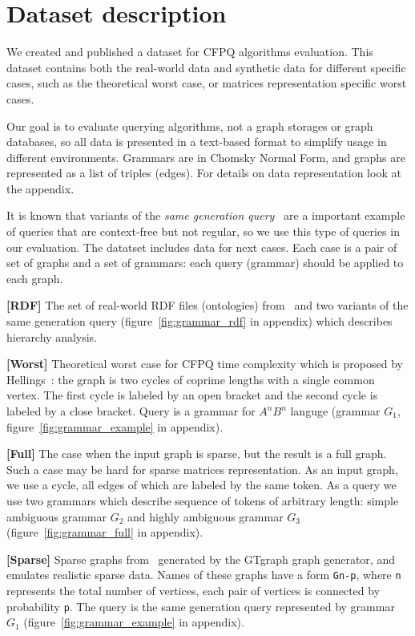\section{Dataset description}

We created and published a dataset for CFPQ algorithms evaluation.
This dataset contains both the real-world data and synthetic data for different specific cases, such as the theoretical worst case, or matrices representation specific worst cases.

Our goal is to evaluate querying algorithms, not a graph storages or graph databases, so all data is presented in a text-based format to simplify usage in different environments.
Grammars are in Chomsky Normal Form, and graphs are represented as a list of triples (edges).
For details on data representation look at the appendix.

It is known that variants of the \textit{same generation query}~\cite{FndDB} are a important example of queries that are context-free but not regular, so we use this type of queries in our evaluation.
The datatset includes data for next cases.
Each case is a pair of set of graphs and a set of grammars: each query (grammar) should be applied to each graph.

\textbf{[RDF]} The set of real-world RDF files (ontologies) from~\cite{RDF} and two variants of the same generation query (figure~\ref{fig:grammar_rdf} in appendix) which describes hierarchy analysis.

\textbf{[Worst]} Theoretical worst case for CFPQ time complexity which is proposed by Hellings~\cite{hellingsPathQuerying}: the graph is two cycles of coprime lengths with a single common vertex.
The first cycle is labeled by an open bracket and the second cycle is labeled by a close bracket.
Query is a grammar for $A^nB^n$ languge (grammar $G_1$, figure~\ref{fig:grammar_example} in appendix).

\textbf{[Full]} The case when the input graph is sparse, but the result is a full graph.
Such a case may be hard for sparse matrices representation.
As an input graph, we use a cycle, all edges of which are labeled by the same token.
As a query we use two grammars which describe sequence of tokens of arbitrary length: simple ambiguous grammar $G_2$  and highly ambiguous grammar $G_3$ (figure~\ref{fig:grammar_full} in appendix).

\textbf{[Sparse]} Sparse graphs from~\cite{fan2018scaling} generated by the GTgraph graph generator, and emulates realistic sparse data.
Names of these graphs have a form \texttt{Gn-p}, where \texttt{n} represents the total number of vertices, each pair of vertices is connected by probability \texttt{p}.
The query is the same generation query represented by grammar $G_1$ (figure~\ref{fig:grammar_example} in appendix).
